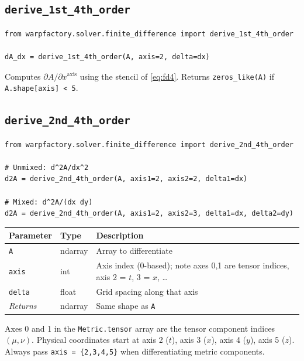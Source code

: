 \documentclass[11pt, a4paper, twoside]{report}
\begin{document}
\subsection{\texttt{derive\_1st\_4th\_order}}
\begin{lstlisting}
from warpfactory.solver.finite_difference import derive_1st_4th_order

dA_dx = derive_1st_4th_order(A, axis=2, delta=dx)
\end{lstlisting}
Computes $\partial A / \partial x^{\text{axis}}$ using the stencil of
\cref{eq:fd4}.  Returns \texttt{zeros\_like(A)} if
\texttt{A.shape[axis] < 5}.

\subsection{\texttt{derive\_2nd\_4th\_order}}
\begin{lstlisting}
from warpfactory.solver.finite_difference import derive_2nd_4th_order

# Unmixed: d^2A/dx^2
d2A = derive_2nd_4th_order(A, axis1=2, axis2=2, delta1=dx)

# Mixed: d^2A/(dx dy)
d2A = derive_2nd_4th_order(A, axis1=2, axis2=3, delta1=dx, delta2=dy)
\end{lstlisting}

\begin{center}
\begin{tabularx}{\linewidth}{llX}
  \toprule
  Parameter    & Type  & Description \\
  \midrule
  \texttt{A}       & ndarray & Array to differentiate \\
  \texttt{axis}    & int     & Axis index (0-based); note axes 0,1 are
                               tensor indices, axis 2 = $t$, 3 = $x$, \ldots \\
  \texttt{delta}   & float   & Grid spacing along that axis \\
  \midrule
  \emph{Returns} & ndarray & Same shape as \texttt{A} \\
  \bottomrule
\end{tabularx}
\end{center}

\begin{warningbox}
Axes 0 and 1 in the \texttt{Metric.tensor} array are the tensor component
indices $(\mu, \nu)$.  Physical coordinates start at axis 2 ($t$), axis 3
($x$), axis 4 ($y$), axis 5 ($z$).  Always pass \texttt{axis = \{2,3,4,5\}}
when differentiating metric components.
\end{warningbox}
\end{document}
